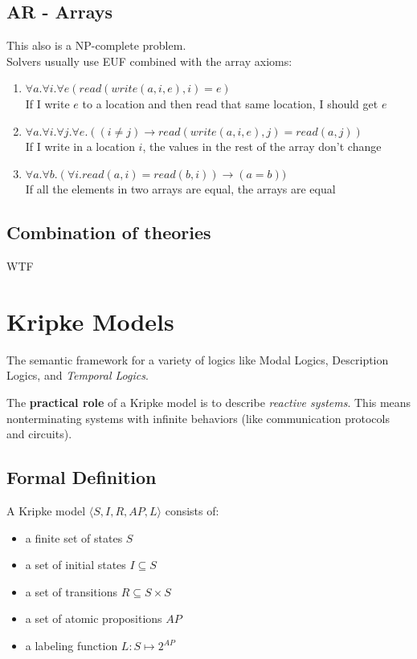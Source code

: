 \documentclass{article}
\begin{document}
\subsection*{AR - Arrays}
This also is a NP-complete problem.\\
Solvers usually use EUF combined with the array axioms:
\begin{enumerate}
    \item $\forall a.\forall i.\forall e (read(write(a,i,e), i) = e)$ \\
        If I write $e$ to a location and then read that same location, I should get $e$
    \item $\forall a. \forall i. \forall j. \forall e. ((i\neq j) \to read(write(a,i,e),j)=read(a,j))$ \\
        If I write in a location $i$, the values in the rest of the array don't change
    \item $\forall a.\forall b. (\forall i.read(a,i)=read(b,i)) \to (a=b))$ \\
        If all the elements in two arrays are equal, the arrays are equal
\end{enumerate}

\subsection{Combination of theories}
WTF

\section{Kripke Models}
The semantic framework for a variety of logics like Modal Logics, Description Logics, and \textit{Temporal Logics}.

The \textbf{practical role} of a Kripke model is to describe \textit{reactive systems}. This means nonterminating systems with infinite behaviors (like communication protocols and circuits).

\subsection{Formal Definition}
A Kripke model $\langle S, I, R, AP, L\rangle$ consists of:
\begin{itemize}
    \item a finite set of states $S$
    \item a set of initial states $I \subseteq S$
    \item a set of transitions $R\subseteq S\times S$
    \item a set of atomic propositions $AP$
    \item a labeling function $L: S\mapsto 2^{AP}$
\end{itemize}
\end{document}
